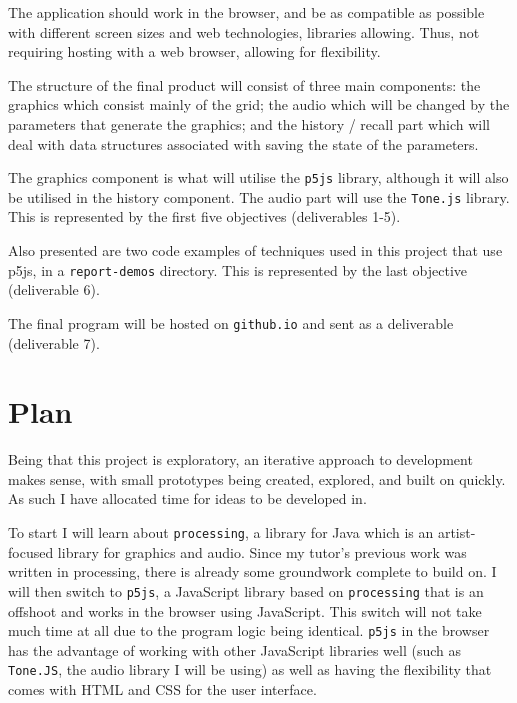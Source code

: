 The application should work in the browser, and be as compatible as possible
with different screen sizes and web technologies, libraries allowing. Thus, not
requiring hosting with a web browser, allowing for flexibility.

The structure of the final product will consist of three main components: the
graphics which consist mainly of the grid; the audio which will be changed by the
parameters that generate the graphics; and the history / recall part which will
deal with data structures associated with saving the state of the parameters.

The graphics component is what will utilise the \verb|p5js| library, although it
will also be utilised in the history component. The audio part will use the
\verb|Tone.js| library. This is represented by the first five objectives
(deliverables 1-5).

Also presented are two code examples of techniques used in this project that use
p5js, in a \verb|report-demos| directory. This is represented by the last
objective (deliverable 6).

The final program will be hosted on \verb|github.io| and sent as a deliverable
(deliverable 7).

\section{Plan}
Being that this project is exploratory, an iterative approach to
development makes sense, with small prototypes being created, explored, and
built on quickly. As such I have allocated time for ideas to be developed in.

To start I will learn about \verb|processing|, a library for Java which is an
artist-focused library for graphics and audio. Since my tutor's previous work
was written in processing, there is already some groundwork complete to build
on. I will then switch to \verb|p5js|, a JavaScript library based on
\verb|processing| that is an offshoot and works in the browser using JavaScript.
This switch will not take much time at all due to the program logic being
identical. \verb|p5js| in the browser has the advantage of working with other
JavaScript libraries well (such as \verb|Tone.JS|, the audio library I will be
using) as well as having the flexibility that comes with HTML and CSS for the
user interface.

